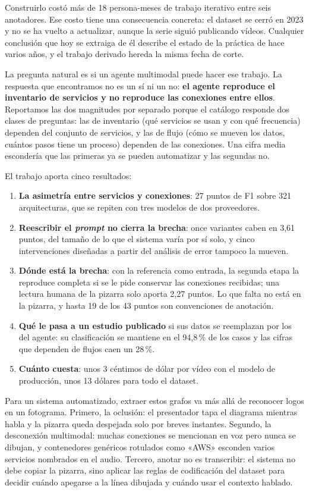 \documentclass[a4paper, twocolumn, 10pt]{IEEEtran}
\begin{document}
Construirlo costó más de 18 persona-meses de trabajo iterativo entre seis
anotadores. Ese costo tiene una consecuencia concreta: el dataset se cerró en 2023
y no se ha vuelto a actualizar, aunque la serie siguió publicando vídeos. Cualquier
conclusión que hoy se extraiga de él describe el estado de la práctica de hace
varios años, y el trabajo derivado hereda la misma fecha de corte.

La pregunta natural es si un agente multimodal puede hacer ese trabajo. La
respuesta que encontramos no es un sí ni un no: \textbf{el agente reproduce el
inventario de servicios y no reproduce las conexiones entre ellos}. Reportamos las
dos magnitudes por separado porque el catálogo responde dos clases de preguntas:
las de inventario (qué servicios se usan y con qué frecuencia) dependen del
conjunto de servicios, y las de flujo (cómo se mueven los datos, cuántos pasos
tiene un proceso) dependen de las conexiones. Una cifra media escondería que las
primeras ya se pueden automatizar y las segundas no.

El trabajo aporta cinco resultados:

\begin{enumerate}\itemsep3pt
\item \textbf{La asimetría entre servicios y conexiones}: 27 puntos de F1 sobre
321 arquitecturas, que se repiten con tres modelos de dos proveedores.
\item \textbf{Reescribir el \emph{prompt} no cierra la brecha}: once variantes
caben en 3,61 puntos, del tamaño de lo que el sistema varía por sí solo, y cinco
intervenciones diseñadas a partir del análisis de error tampoco la mueven.
\item \textbf{Dónde está la brecha}: con la referencia como entrada, la segunda
etapa la reproduce completa si se le pide conservar las conexiones recibidas; una
lectura humana de la pizarra solo aporta 2,27 puntos. Lo que falta no está en la
pizarra, y hasta 19 de los 43 puntos son convenciones de anotación.
\item \textbf{Qué le pasa a un estudio publicado} si sus datos se reemplazan por
los del agente: su clasificación se mantiene en el 94,8\,\% de los casos y las
cifras que dependen de flujos caen un 28\,\%.
\item \textbf{Cuánto cuesta}: unos 3 céntimos de dólar por vídeo con el modelo de
producción, unos 13 dólares para todo el dataset.
\end{enumerate}

Para un sistema automatizado, extraer estos grafos va más allá de reconocer logos
en un fotograma. Primero, la oclusión: el presentador tapa el diagrama mientras
habla y la pizarra queda despejada solo por breves instantes. Segundo, la
desconexión multimodal: muchas conexiones se mencionan en voz pero nunca se
dibujan, y contenedores genéricos rotulados como «AWS» esconden varios servicios
nombrados en el audio. Tercero, anotar no es transcribir: el sistema no debe copiar
la pizarra, sino aplicar las reglas de codificación del dataset para decidir cuándo
apegarse a la línea dibujada y cuándo usar el contexto hablado.
\end{document}
